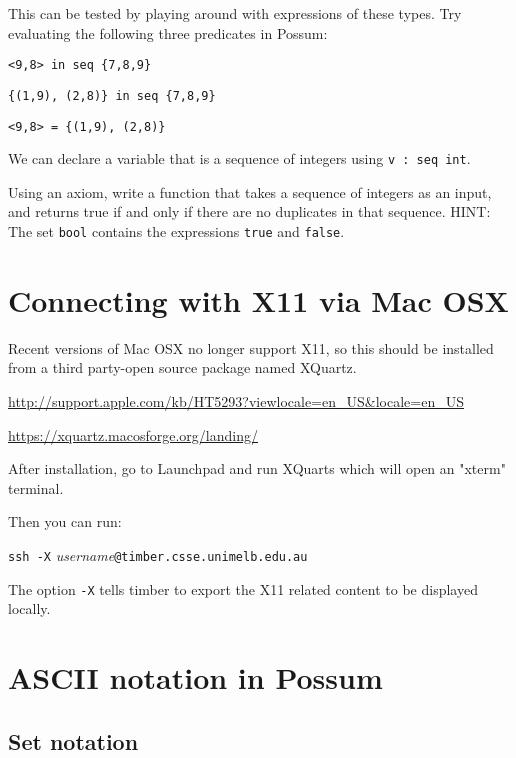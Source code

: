 \documentclass{article}
\begin{document}
\begin{enumerate}
This can be tested by playing around with expressions of these types. Try evaluating the following three predicates in Possum:

 \quad\quad \texttt{<9,8> in seq \{7,8,9\}}

 \quad\quad \texttt{\{(1,9), (2,8)\} in seq \{7,8,9\}}

 \quad\quad \texttt{<9,8> = \{(1,9), (2,8)\}}

 We can declare a variable that is a sequence of integers using \texttt{v : seq int}.

 Using an axiom, write a function that takes a sequence of integers as an input, and returns true if and only if there are no duplicates in that sequence. HINT: The set \texttt{bool} contains the expressions \texttt{true} and \texttt{false}.

\end{enumerate}

\pagebreak

\section*{Connecting with X11 via Mac OSX}

Recent versions of Mac OSX no longer support X11, so this should be installed from a third party-open source package named XQuartz.

\url{http://support.apple.com/kb/HT5293?viewlocale=en_US&locale=en_US}

\url{https://xquartz.macosforge.org/landing/}

After installation, go to Launchpad and run XQuarts which will open an "xterm" terminal.

Then you can run:

 \quad \texttt{ssh -X} \emph{username}\texttt{@timber.csse.unimelb.edu.au}

 The option \texttt{-X} tells timber to export the X11 related content to be displayed locally.


\pagebreak

\section*{ASCII notation in Possum}

\subsection*{Set notation}
\end{document}
